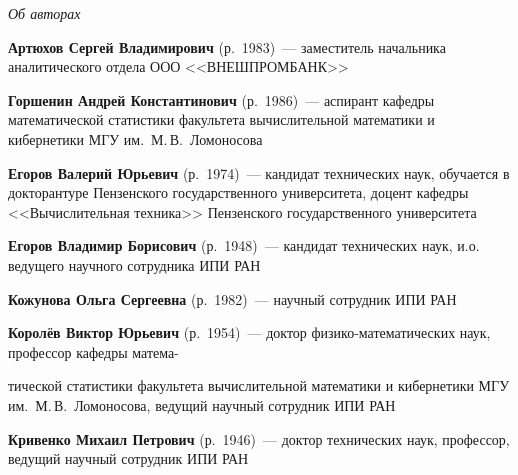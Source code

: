 \vspace*{-48pt}
\begin{center}\LARGE
\textit{Об авторах}
\end{center}
\thispagestyle{empty}

\vspace*{36pt}

\begin{multicols}{2}


\noindent
\textbf{Артюхов Сергей Владимирович} (р.\ 1983)~---  заместитель начальника
аналитического отдела ООО <<ВНЕШПРОМБАНК>>

\vspace*{4.5pt}

\noindent
\textbf{Горшенин Андрей Константинович} (р.\ 1986)~---
аспирант кафедры математической статистики факультета вычислительной
математики и кибернетики МГУ им.\ М.\,В.~Ломоносова

\vspace*{4.5pt}


\noindent
\textbf{Егоров Валерий Юрьевич} (р.\ 1974)~---  кандидат технических наук,
обучается в докторантуре Пензенского государственного университета,
доцент кафедры <<Вычислительная техника>> Пензенского\linebreak
государственного университета

\vspace*{4.5pt}

\noindent %
\textbf{Егоров Владимир Борисович} (р.\ 1948)~---  кандидат технических наук,
и.о. ведущего научного сотрудника   ИПИ РАН

\vspace*{4.5pt}

\noindent
\textbf{Кожунова Ольга Сергеевна} (р.\ 1982)~---   научный сотрудник
ИПИ РАН

\vspace*{4.5pt}

\noindent %
\textbf{Королёв Виктор Юрьевич} (р.\ 1954)~---  доктор физико-математических наук,
профессор кафедры матема-\linebreak\vspace*{-12pt}
\columnbreak

\noindent
тической статистики факультета вычислительной математики
и кибернетики МГУ им.\ М.\,В.~Ломоносова,
ведущий научный сотрудник ИПИ РАН

\vspace*{5.5pt}


\noindent
\textbf{Кривенко Михаил Петрович} (р.\ 1946)~---  доктор
технических наук, профессор, ведущий научный сотрудник ИПИ РАН
%
\vspace*{6pt}



\end{multicols}
